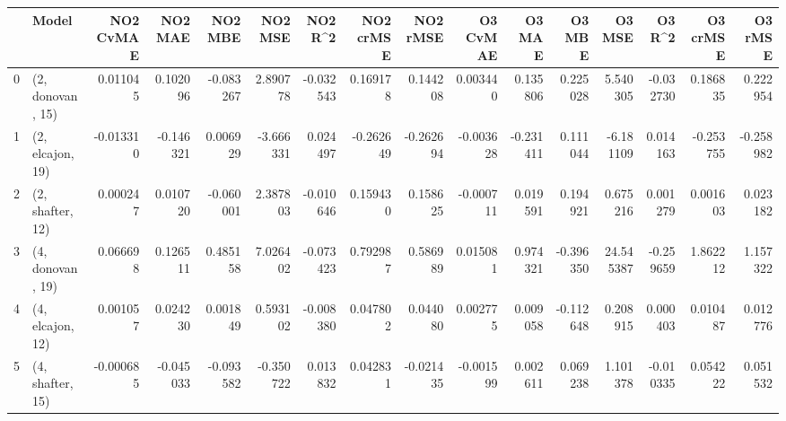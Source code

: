 \begin{tabular}{llrrrrrrrrrrrrrr}
\toprule
{} &             Model &  NO2 CvMAE &   NO2 MAE &   NO2 MBE &   NO2 MSE &   NO2 R\textasciicircum2 &  NO2 crMSE &  NO2 rMSE &  O3 CvMAE &    O3 MAE &    O3 MBE &     O3 MSE &    O3 R\textasciicircum2 &  O3 crMSE &   O3 rMSE \\
\midrule
0 &  (2, donovan, 15) &   0.011045 &  0.102096 & -0.083267 &  2.890778 & -0.032543 &   0.169178 &  0.144208 &  0.003440 &  0.135806 &  0.225028 &   5.540305 & -0.032730 &  0.186835 &  0.222954 \\
1 &  (2, elcajon, 19) &  -0.013310 & -0.146321 &  0.006929 & -3.666331 &  0.024497 &  -0.262649 & -0.262694 & -0.003628 & -0.231411 &  0.111044 &  -6.181109 &  0.014163 & -0.253755 & -0.258982 \\
2 &  (2, shafter, 12) &   0.000247 &  0.010720 & -0.060001 &  2.387803 & -0.010646 &   0.159430 &  0.158625 & -0.000711 &  0.019591 &  0.194921 &   0.675216 &  0.001279 &  0.001603 &  0.023182 \\
3 &  (4, donovan, 19) &   0.066698 &  0.126511 &  0.485158 &  7.026402 & -0.073423 &   0.792987 &  0.586989 &  0.015081 &  0.974321 & -0.396350 &  24.545387 & -0.259659 &  1.862212 &  1.157322 \\
4 &  (4, elcajon, 12) &   0.001057 &  0.024230 &  0.001849 &  0.593102 & -0.008380 &   0.047802 &  0.044080 &  0.002775 &  0.009058 & -0.112648 &   0.208915 &  0.000403 &  0.010487 &  0.012776 \\
5 &  (4, shafter, 15) &  -0.000685 & -0.045033 & -0.093582 & -0.350722 &  0.013832 &   0.042831 & -0.021435 & -0.001599 &  0.002611 &  0.069238 &   1.101378 & -0.010335 &  0.054222 &  0.051532 \\
\bottomrule
\end{tabular}
